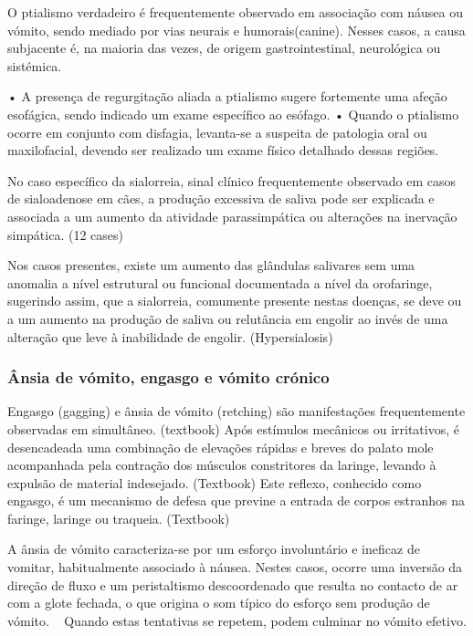 O ptialismo verdadeiro é frequentemente observado em associação com náusea ou vómito, sendo mediado por vias neurais e humorais(canine). Nesses casos, a causa subjacente é, na maioria das vezes, de origem gastrointestinal, neurológica ou sistémica. ~\cite{ettinger_textbook_2010}


•	A presença de regurgitação aliada a ptialismo sugere fortemente uma afeção esofágica, sendo indicado um exame específico ao esófago.
•	Quando o ptialismo ocorre em conjunto com disfagia, levanta-se a suspeita de patologia oral ou maxilofacial, devendo ser realizado um exame físico detalhado dessas regiões. ~\cite{ettinger_textbook_2010}


No caso específico da sialorreia, sinal clínico frequentemente observado em casos de sialoadenose em cães, a produção excessiva de saliva pode ser explicada e associada a um aumento da atividade parassimpática ou alterações na inervação simpática. (12 cases) 


Nos casos presentes, existe um aumento das glândulas salivares sem uma anomalia a nível estrutural ou funcional documentada a nível da orofaringe, sugerindo assim, que a sialorreia, comumente presente nestas doenças, se deve ou a um aumento na produção de saliva ou relutância em engolir ao invés de uma alteração que leve à inabilidade de engolir. (Hypersialosis)

\subsubsection{Ânsia de vómito, engasgo e vómito crónico}

Engasgo (gagging) e ânsia de vómito (retching) são manifestações frequentemente observadas em simultâneo. (textbook) 
Após estímulos mecânicos ou irritativos, é desencadeada uma combinação de elevações rápidas e breves do palato mole acompanhada pela contração dos músculos constritores da laringe, levando à expulsão de material indesejado. (Textbook) Este reflexo, conhecido como engasgo, é um mecanismo de defesa que previne a entrada de corpos estranhos na faringe, laringe ou traqueia. (Textbook)


A ânsia de vómito caracteriza-se por um esforço involuntário e ineficaz de vomitar, habitualmente associado à náusea. Nestes casos, ocorre uma inversão da direção de fluxo e um peristaltismo descoordenado que resulta no contacto de ar com a glote fechada, o que origina o som típico do esforço sem produção de vómito. ~\cite{Das_Textbook} Quando estas tentativas se repetem, podem culminar no vómito efetivo. ~\cite{Das_Textbook}


